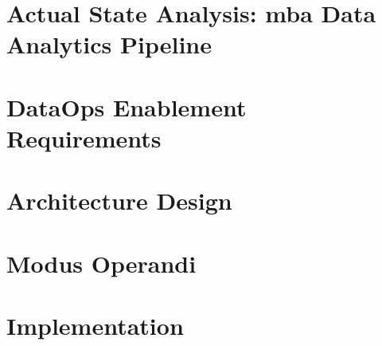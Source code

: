 

\section{Actual State Analysis: \acs{mba} Data Analytics Pipeline}
	
	\label{sec:3-analysis}
	
\section{DataOps Enablement Requirements}
	
	\label{sec:3-requirements}
	
\section{Architecture Design}
	
	\label{sec:3-architecture}
	
\section{Modus Operandi}
	
	\label{sec:3-modus-operandi}
	
\section{Implementation}
	
	\label{sec:3-implementation}